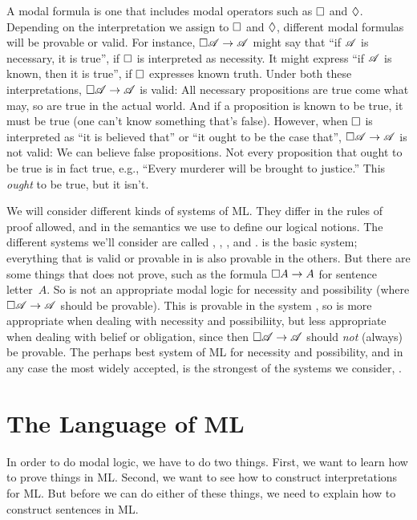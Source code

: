 A modal formula is one that includes modal operators such as $\Box$ and $\Diamond$. Depending on the interpretation we assign to $\Box$ and $\Diamond$, different modal formulas will be provable or valid. For instance, $\Box \mathscr{A} \rightarrow \mathscr{A}$ might say that ``if $\mathscr{A}$ is necessary, it is true'', if $\Box$ is interpreted as necessity. It might express ``if $\mathscr{A}$ is known, then it is true'', if $\Box$ expresses known truth. Under both these interpretations, $\Box\mathscr{A} \rightarrow \mathscr{A}$ is valid: All necessary propositions are true come what may, so are true in the actual world. And if a proposition is known to be true, it must be true (one can't know something that's false). However, when $\Box$ is interpreted as ``it is believed that'' or ``it ought to be the case that'', $\Box\mathscr{A} \rightarrow \mathscr{A}$ is not valid: We can believe false propositions. Not every proposition that ought to be true is in fact true, e.g., ``Every murderer will be brought to justice.'' This \emph{ought} to be true, but it isn't.

We will consider different kinds of systems of ML. They differ in the rules of proof allowed, and in the semantics we use to define our logical notions. The different systems we'll consider are called \mlK, \mlT, \mlSfour, and \mlSfive. \mlK{} is the basic system; everything that is valid or provable in \mlK{} is also provable in the others. But there are some things that \mlK{} does not prove, such as the formula $\Box A \rightarrow A$ for sentence letter~$A$. So \mlK{} is not an appropriate modal logic for necessity and possibility (where $\Box\mathscr{A} \rightarrow \mathscr{A}$ should be provable). This is provable in the system \mlT, so \mlT{} is more appropriate when dealing with necessity and possibiliity, but less appropriate when dealing with belief or obligation, since then $\Box\mathscr{A} \rightarrow \mathscr{A}$ should \emph{not} (always) be provable. The perhaps best system of ML for necessity and possibility, and in any case the most widely accepted, is the strongest of the systems we consider, \mlSfive.

\section{The Language of ML}
\label{TFLtoML}

In order to do modal logic, we have to do two things. First, we want to learn how to prove things in ML. Second, we want to see how to construct interpretations for ML. But before we can do either of these things, we need to explain how to construct sentences in ML.

